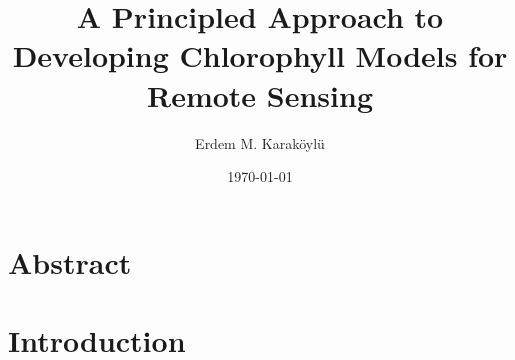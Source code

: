 \documentclass[10pt]{article}
\begin{document}
\author{Erdem M. Karaköylü}
\title{A Principled Approach to Developing Chlorophyll Models for Remote Sensing}
\date{\today}
\maketitle
\tableofcontents
\newpage

\newcommand{\reddash}{\raisebox{2pt}{\tikz{\draw[-,red,dashed,line width=1.2pt](0,0) -- (5mm,0);}}}
\newcommand{\blkdash}{\raisebox{2pt}{\tikz{\draw[-,black,dashed,line width=1.2pt](0,0) -- (5mm,0);}}}
\newcommand{\blksold}{\raisebox{2pt}{\tikz{\draw[-,black,solid,line width=1.2pt](0,0) -- (5mm,0);}}}
\section{Abstract}

\newpage

\section{Introduction}
\end{document}
